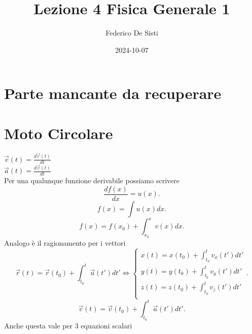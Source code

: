 \documentclass[12px]{article}
\title{Lezione 4 Fisica Generale 1}
\date{2024-10-07}
\author{Federico De Sisti}
\begin{document}
	\maketitle
	\newpage
	\section{Parte mancante da recuperare}
	\section{Moto Circolare}
$\overrightarrow{v}(t) = \frac{d \overrightarrow{r}(t)}{dt}$ \\
$\overrightarrow{a}(t) = \frac{d \overrightarrow{v}(t)}{dt}$\\
Per una qualunque funzione derivabile possiamo scrivere
\[
	\frac{df(x)}{dx} = u(x)
.\] 
\[ f(x) = \int u(x) dx
.\]
\[
	f(x) = f(x_0) + \int_{x_0}^x v(x) dx
.\] 
Analogo è il ragionamento per i vettori
\[
	\overrightarrow{r}(t) = \overrightarrow{r}(t_0) + \int_{t_0}^t \overrightarrow{u}(t') dt'  \Leftrightarrow \begin{cases}
		x(t) = x(t_0) + \int_{t_0}^t v_x(t')dt'\\
		y(t) = y(t_0) + \int_{t_0}^t v_y(t')dt'\\
		z(t) = z(t_0) + \int_{t_0}^t v_z(t')dt'\\
	\end{cases}
.\] 
\[
	\overrightarrow{v}(t) = \overrightarrow{v}(t_0) + \int_{t_0}^t \overrightarrow{a}(t') dt'
.\] 
Anche questa vale per 3 equazioni scalari
\end{document}
